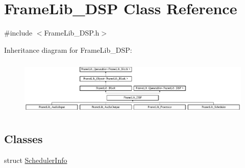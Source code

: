 \hypertarget{class_frame_lib___d_s_p}{}\section{Frame\+Lib\+\_\+\+D\+SP Class Reference}
\label{class_frame_lib___d_s_p}


{\ttfamily \#include $<$Frame\+Lib\+\_\+\+D\+S\+P.\+h$>$}

Inheritance diagram for Frame\+Lib\+\_\+\+D\+SP\+:\begin{figure}[H]
\begin{center}
\leavevmode
\includegraphics[height=2.723735cm]{class_frame_lib___d_s_p}
\end{center}
\end{figure}
\subsection*{Classes}
\begin{DoxyCompactItemize}
\item 
struct \hyperlink{struct_frame_lib___d_s_p_1_1_scheduler_info}{Scheduler\+Info}
\end{DoxyCompactItemize}
